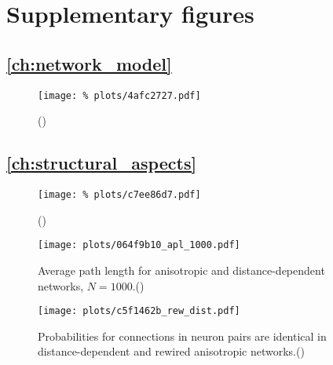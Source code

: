 





\section{Supplementary figures}\label{sec:supp_figures}

\subsection*{\autoref{ch:network_model}}

\begin{figure}[H]
  \centering
  \texttt{[image: \%
    plots/4afc2727.pdf]}
  \caption{()}
  \label{suppfig:rew_stats}
\end{figure}


\subsection*{\autoref{ch:structural_aspects}}

\begin{figure}[H]
  \centering
  \texttt{[image: \%
    plots/c7ee86d7.pdf]}
  \caption{()}
  \label{suppfig:out_degree}
\end{figure}


\begin{figure}[htp]
  \centering
  \texttt{[image: plots/064f9b10\_apl\_1000.pdf]}
  \caption{Average path length for anisotropic and distance-dependent
    networks, $N=1000$.()} %
  \label{suppfig:small_world}
\end{figure}


\begin{figure}[htp]
  \centering
  \texttt{[image: plots/c5f1462b\_rew\_dist.pdf]}
  \caption{Probabilities for connections in neuron pairs are identical
    in distance-dependent and rewired anisotropic
    networks.()} %
  \label{suppfig:two_neurons_dist_rew}
  \end{figure}




